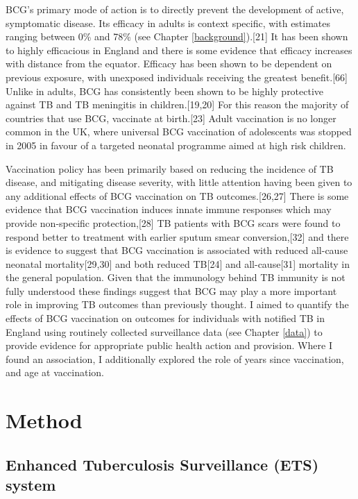 \documentclass[11pt,twoside]{bristolthesis}
\begin{document}
  BCG's primary mode of action is to directly prevent the development of active, symptomatic disease. Its efficacy in adults is context specific, with estimates ranging between 0\% and 78\% (see Chapter \ref{background}).{[}21{]} It has been shown to highly efficacious in England and there is some evidence that efficacy increases with distance from the equator. Efficacy has been shown to be dependent on previous exposure, with unexposed individuals receiving the greatest benefit.{[}66{]} Unlike in adults, BCG has consistently been shown to be highly protective against TB and TB meningitis in children.{[}19,20{]} For this reason the majority of countries that use BCG, vaccinate at birth.{[}23{]} Adult vaccination is no longer common in the UK, where universal BCG vaccination of adolescents was stopped in 2005 in favour of a targeted neonatal programme aimed at high risk children.
  
  Vaccination policy has been primarily based on reducing the incidence of TB disease, and mitigating disease severity, with little attention having been given to any additional effects of BCG vaccination on TB outcomes.{[}26,27{]} There is some evidence that BCG vaccination induces innate immune responses which may provide non-specific protection,{[}28{]} TB patients with BCG scars were found to respond better to treatment with earlier sputum smear conversion,{[}32{]} and there is evidence to suggest that BCG vaccination is associated with reduced all-cause neonatal mortality{[}29,30{]} and both reduced TB{[}24{]} and all-cause{[}31{]} mortality in the general population. Given that the immunology behind TB immunity is not fully understood these findings suggest that BCG may play a more important role in improving TB outcomes than previously thought. I aimed to quantify the effects of BCG vaccination on outcomes for individuals with notified TB in England using routinely collected surveillance data (see Chapter \ref{data}) to provide evidence for appropriate public health action and provision. Where I found an association, I additionally explored the role of years since vaccination, and age at vaccination.
  
  \hypertarget{method-3}{%
  \section{Method}\label{method-3}}
  
  \hypertarget{enhanced-tuberculosis-surveillance-ets-system}{%
  \subsection{Enhanced Tuberculosis Surveillance (ETS) system}\label{enhanced-tuberculosis-surveillance-ets-system}}
  
\end{document}
